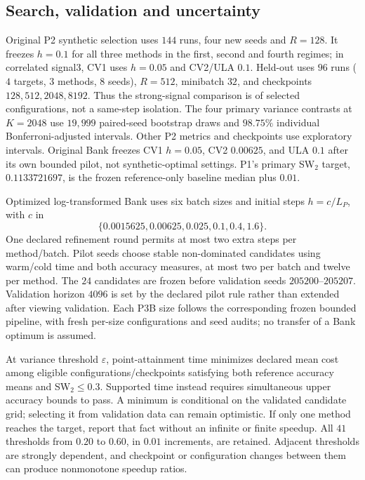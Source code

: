\subsection{Search, validation and uncertainty}\label{app:selection}
Original P2 synthetic selection uses $144$ runs, four new seeds and $R=128$. It freezes $h=0.1$ for all three methods in the first, second and fourth regimes; in correlated signal3, CV1 uses $h=0.05$ and CV2/ULA $0.1$. Held-out uses $96$ runs ($4$ targets, $3$ methods, $8$ seeds), $R=512$, minibatch $32$, and checkpoints $128,512,2048,8192$. Thus the strong-signal comparison is of selected configurations, not a same-step isolation. The four primary variance contrasts at $K=2048$ use $19{,}999$ paired-seed bootstrap draws and $98.75\%$ individual Bonferroni-adjusted intervals. Other P2 metrics and checkpoints use exploratory intervals. Original Bank freezes CV1 $h=0.05$, CV2 $0.00625$, and ULA $0.1$ after its own bounded pilot, not synthetic-optimal settings. P1's primary SW$_2$ target, $0.1133721697$, is the frozen reference-only baseline median plus $0.01$.

Optimized log-transformed Bank uses six batch sizes and initial steps $h=c/L_P$, with $c$ in\[\{0.0015625,0.00625,0.025,0.1,0.4,1.6\}.\] One declared refinement round permits at most two extra steps per method/batch. Pilot seeds choose stable non-dominated candidates using warm/cold time and both accuracy measures, at most two per batch and twelve per method. The $24$ candidates are frozen before validation seeds $205200$--$205207$. Validation horizon $4096$ is set by the declared pilot rule rather than extended after viewing validation. Each P3B size follows the corresponding frozen bounded pipeline, with fresh per-size configurations and seed audits; no transfer of a Bank optimum is assumed.

At variance threshold $\varepsilon$, point-attainment time minimizes declared mean cost among eligible configurations/checkpoints satisfying both reference accuracy means and SW$_2\leq0.3$. Supported time instead requires simultaneous upper accuracy bounds to pass. A minimum is conditional on the validated candidate grid; selecting it from validation data can remain optimistic. If only one method reaches the target, report that fact without an infinite or finite speedup. All $41$ thresholds from $0.20$ to $0.60$, in $0.01$ increments, are retained. Adjacent thresholds are strongly dependent, and checkpoint or configuration changes between them can produce nonmonotone speedup ratios.

